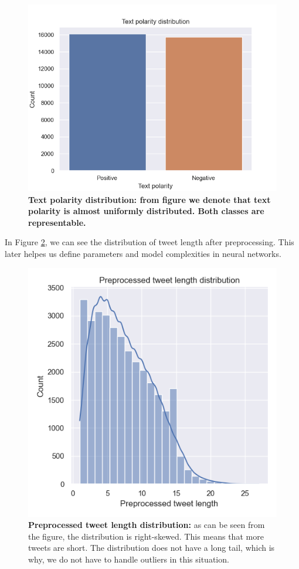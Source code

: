 \documentclass[conference]{IEEEtran}
\begin{document}
\begin{figure}[hbt!]\centering
\centering
\includegraphics[width=\linewidth]{text-polarity-distr}
\caption{\textbf{Text polarity distribution: from figure we denote that text polarity is almost uniformly distributed. Both classes are representable. }}
\label{pic2}
\end{figure}

In Figure \ref{pic3}, we can see the distribution of tweet length after preprocessing. This later helpes us define parameters and model complexities in neural networks.

\begin{figure}[hbt!]\centering
\centering
\includegraphics[width=\linewidth]{tweet-len-distr}
\caption{\textbf{Preprocessed tweet length distribution:} as can be seen from the figure, the distribution is right-skewed. This means that more tweets are short. The distribution does not have a long tail, which is why, we do not have to handle outliers in this situation.}
\label{pic3}
\end{figure}
\end{document}
